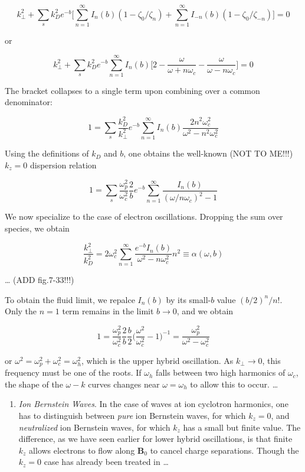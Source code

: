 \documentclass[
  notoc %
]{tufte-book}
\providecommand{\tightlist}{%
  \setlength{\itemsep}{0pt}\setlength{\parskip}{0pt}
}
\begin{document}
\[
k_\perp^2 + \sum_s k_D^2 e^{-b}\Big[ \sum_{n=1}^{\infty} I_n(b)(1 - \zeta_0 /\zeta_n) + \sum_{n=1}^{\infty} I_{-n}(b)(1 - \zeta_0 /\zeta_{-n})\Big] = 0
\]

or

\[
k_\perp^2 + \sum_s k_D^2 e^{-b}\sum_{n=1}^{\infty} I_n(b)\Big[ 2-\frac{\omega}{\omega+n\omega_c} - \frac{\omega}{\omega-n\omega_c} \Big] = 0
\]

The bracket collapses to a single term upon combining over a common
denominator:

\[
1 = \sum_s \frac{k_D^2}{k_\perp^2}e^{-b}\sum_{n=1}^\infty I_n(b)\frac{2n^2\omega_c^2}{\omega^2 - n^2\omega_c^2}
\]

Using the definitions of \(k_D\) and \(b\), one obtains the well-known
(NOT TO ME!!!) \(k_z=0\) dispersion relation

\[
1 = \sum_s \frac{\omega_p^2}{\omega_c^2}\frac{2}{b}e^{-b}\sum_{n=1}^\infty \frac{I_n(b)}{(\omega/n\omega_c)^2-1}
\]

We now specialize to the case of electron oscillations. Dropping the sum
over species, we obtain

\[
\frac{k_\perp^2}{k_D^2} = 2\omega_c^2 \sum_{n=1}^\infty \frac{e^{-b}I_n(b)}{\omega^2 - n\omega_c^2}n^2 \equiv \alpha(\omega, b)
\]

\ldots{} (ADD fig.7-33!!!)

To obtain the fluid limit, we repalce \(I_n(b)\) by its small-\(b\)
value \((b/2)^n/n!\). Only the \(n=1\) term remains in the limit
\(b\rightarrow 0\), and we obtain

\[
1 = \frac{\omega_p^2}{\omega_c^2}\frac{2}{b}\frac{b}{2}\Big( \frac{\omega^2}{\omega_c^2} - 1\Big)^{-1} = \frac{\omega_p^2}{\omega^2 - \omega_c^2}
\]

or \(\omega^2 = \omega_p^2 + \omega_c^2 = \omega_h^2\), which is the
upper hybrid oscillation. As \(k_\perp\rightarrow 0\), this frequency
must be one of the roots. If \(\omega_h\) falls between two high
harmonics of \(\omega_c\), the shape of the \(\omega-k\) curves changes
near \(\omega = \omega_h\) to allow this to occur. \ldots{}

\begin{enumerate}
\def\labelenumi{(\Alph{enumi})}
\setcounter{enumi}{1}
\tightlist
\item
  \emph{Ion Bernstein Waves}. In the case of waves at ion cyclotron
  harmonics, one has to distinguish between \emph{pure} ion Bernstein
  waves, for which \(k_z=0\), and \emph{neutralized} ion Bernstein
  waves, for which \(k_z\) has a small but finite value. The difference,
  as we have seen earlier for lower hybrid oscillations, is that finite
  \(k_z\) allows electrons to flow along \(\mathbf{B}_0\) to cancel
  charge separations. Though the \(k_z=0\) case has already been treated
  in \ldots{}
\end{enumerate}
\end{document}
